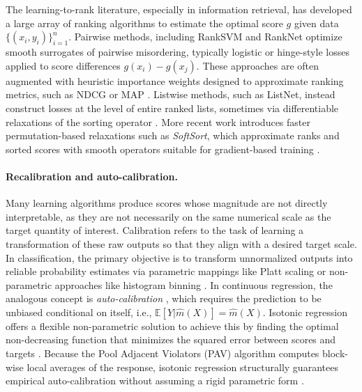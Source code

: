\documentclass[11pt]{article}
\theoremstyle{plain}
\theoremstyle{plain}
\theoremstyle{plain}
\theoremstyle{plain}
\theoremstyle{plain}
\theoremstyle{plain}
\theoremstyle{plain}
\begin{document}
The learning-to-rank literature, especially in information retrieval, has developed a large array of ranking algorithms to estimate the optimal score $g$ given data $\{(x_i, y_i)\}_{i=1}^n$. Pairwise methods, including RankSVM \citep{joachims2002optimizing} and RankNet \citep{burges2005learning} optimize smooth surrogates of pairwise misordering, typically logistic or hinge-style losses applied to score differences $g(x_i)-g(x_j)$. These approaches are often augmented with heuristic importance weights designed to approximate ranking metrics, such as NDCG or MAP \citep{burges2010ranknet}.  
Listwise methods, such as ListNet, instead construct losses at the level of entire ranked lists, sometimes via differentiable relaxations of the sorting operator \citep{cao2007learning,taylor2008SoftRank}.  
More recent work introduces faster permutation-based relaxations such as \emph{SoftSort}, which approximate ranks and sorted scores with smooth operators suitable for gradient-based training \citep{prillo2020softsort}. 

\paragraph{Recalibration and auto-calibration.}
Many learning algorithms produce scores whose magnitude are not directly interpretable, as they are not necessarily on the same numerical scale as the target quantity of interest. Calibration refers to the task of learning a transformation of these raw outputs so that they align with a desired target scale. In classification, the primary objective is to transform unnormalized outputs into reliable probability estimates via parametric mappings like Platt scaling \citep{platt1999probabilistic, niculescu2005predicting} or non-parametric approaches like histogram binning \citep{zadrozny2001obtaining, naeini2015obtaining}. In continuous regression, the analogous concept is \emph{auto-calibration} \citep{kruger2021generic, gneiting2023regression, wuthrich2023model}, which requires the prediction to be unbiased conditional on itself, i.e., $\mathbb{E}[Y|\hat{m}(X)] = \hat{m}(X)$. Isotonic regression offers a flexible non-parametric solution to achieve this by finding the optimal non-decreasing function that minimizes the squared error between scores and targets \citep{zadrozny2002transforming}. Because the Pool Adjacent Violators (PAV) algorithm computes block-wise local averages of the response, isotonic regression structurally guarantees empirical auto-calibration without assuming a rigid parametric form \citep{barlow1972statistical,guntuboyina2018nonparametric}.
 
\end{document}
